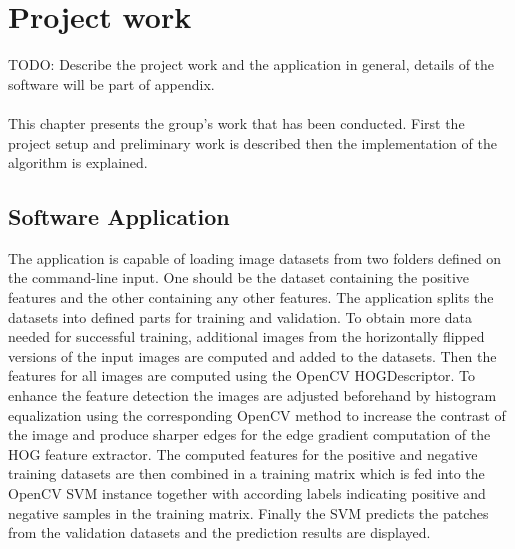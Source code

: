 
\section{Project work}\label{sec:projectwork}

TODO: Describe the project work and the application in general, details of the software will be part of appendix.
\\
\\
This chapter presents the group's work that has been conducted. First the project setup and preliminary work is described then the implementation of the algorithm is explained.


\subsection{Software Application}

The application is capable of loading image datasets from two folders defined on the command-line input. One should be the dataset containing the positive features and the other containing any other features. The application splits the datasets into defined parts for training and validation. To obtain more data needed for successful training, additional images from the horizontally flipped versions of the input images are computed and added to the datasets. Then the features for all images are computed using the OpenCV HOGDescriptor. To enhance the feature detection the images are adjusted beforehand by histogram equalization using the corresponding OpenCV method to increase the contrast of the image and produce sharper edges for the edge gradient computation of the HOG feature extractor. The computed features for the positive and negative training datasets are then combined in a training matrix which is fed into the OpenCV SVM instance together with according labels indicating positive and negative samples in the training matrix. Finally the SVM predicts the patches from the validation datasets and the prediction results are displayed.
